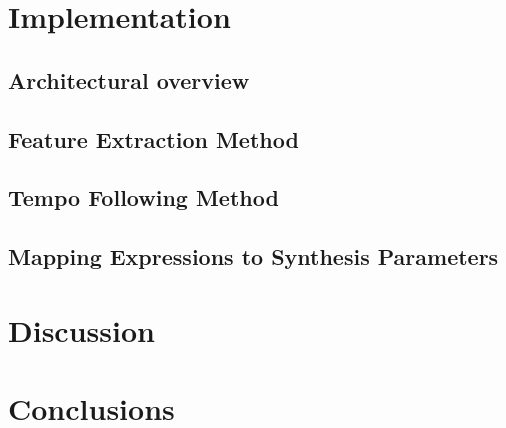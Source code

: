 \chapter{Implementation}
\label{chapter:implementation}

\section{Architectural overview}

\section{Feature Extraction Method}

\section{Tempo Following Method}

\section{Mapping Expressions to Synthesis Parameters}

\chapter{Discussion}
\label{chapter:discussion}

\chapter{Conclusions}
\label{chapter:conclusions}



